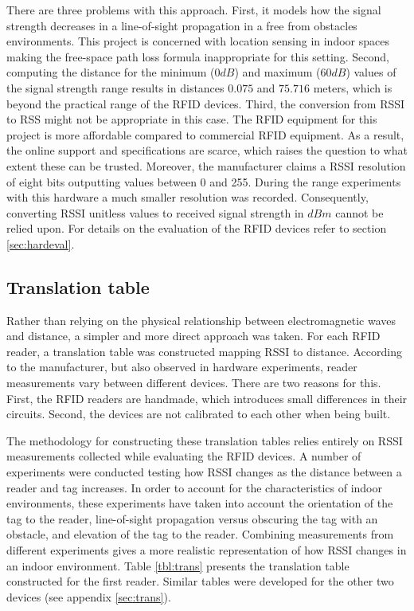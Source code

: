 There are three problems with this approach. First, it models how the signal strength decreases in a line-of-sight propagation in a free from obstacles environments. This project is concerned with location sensing in indoor spaces making the free-space path loss formula inappropriate for this setting. Second, computing the distance for the minimum ($0dB$) and maximum ($60dB$) values of the signal strength range results in distances $0.075$ and $75.716$ meters, which is beyond the practical range of the RFID devices. Third, the conversion from RSSI to RSS might not be appropriate in this case. The RFID equipment for this project is more affordable compared to commercial RFID equipment. As a result, the online support and specifications are scarce, which raises the question to what extent these can be trusted. Moreover, the manufacturer claims a RSSI resolution of eight bits outputting values between 0 and 255. During the range experiments with this hardware a much smaller resolution was recorded. Consequently, converting RSSI unitless values to received signal strength in $dBm$ cannot be relied upon. For details on the evaluation of the RFID devices refer to section \ref{sec:hardeval}. 

\subsection{Translation table}
\label{subsec:transtbl}

Rather than relying on the physical relationship between electromagnetic waves and distance, a simpler and more direct approach was taken. For each RFID reader, a translation table was constructed mapping RSSI to distance. According to the manufacturer, but also observed in hardware experiments, reader measurements vary between different devices. There are two reasons for this. First, the RFID readers are handmade, which introduces small differences in their circuits. Second, the devices are not calibrated to each other when being built.   

The methodology for constructing these translation tables relies entirely on RSSI measurements collected while evaluating the RFID devices. A number of experiments were conducted testing how RSSI changes as the distance between a reader and tag increases. In order to account for the characteristics of indoor environments, these experiments have taken into account the orientation of the tag to the reader, line-of-sight propagation versus obscuring the tag with an obstacle, and elevation of the tag to the reader. Combining measurements from different experiments gives a more realistic representation of how RSSI changes in an indoor environment. Table \ref{tbl:trans} presents the translation table constructed for the first reader. Similar tables were developed for the other two devices (see appendix \ref{sec:trans}).

